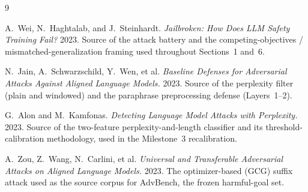 \documentclass[11pt,a4paper]{article}
\begin{document}
\clearpage
\begin{thebibliography}{9}

A.~Wei, N.~Haghtalab, and J.~Steinhardt.
\textit{Jailbroken: How Does LLM Safety Training Fail?}
2023. Source of the attack battery and the competing-objectives / mismatched-generalization framing used throughout Sections~1 and~6.

N.~Jain, A.~Schwarzschild, Y.~Wen, et al.
\textit{Baseline Defenses for Adversarial Attacks Against Aligned Language Models.}
2023. Source of the perplexity filter (plain and windowed) and the paraphrase preprocessing defense (Layers~1--2).

G.~Alon and M.~Kamfonas.
\textit{Detecting Language Model Attacks with Perplexity.}
2023. Source of the two-feature perplexity-and-length classifier and its threshold-calibration methodology, used in the Milestone~3 recalibration.

A.~Zou, Z.~Wang, N.~Carlini, et al.
\textit{Universal and Transferable Adversarial Attacks on Aligned Language Models.}
2023. The optimizer-based (GCG) suffix attack used as the source corpus for AdvBench, the frozen harmful-goal set.

\end{thebibliography}
\end{document}
